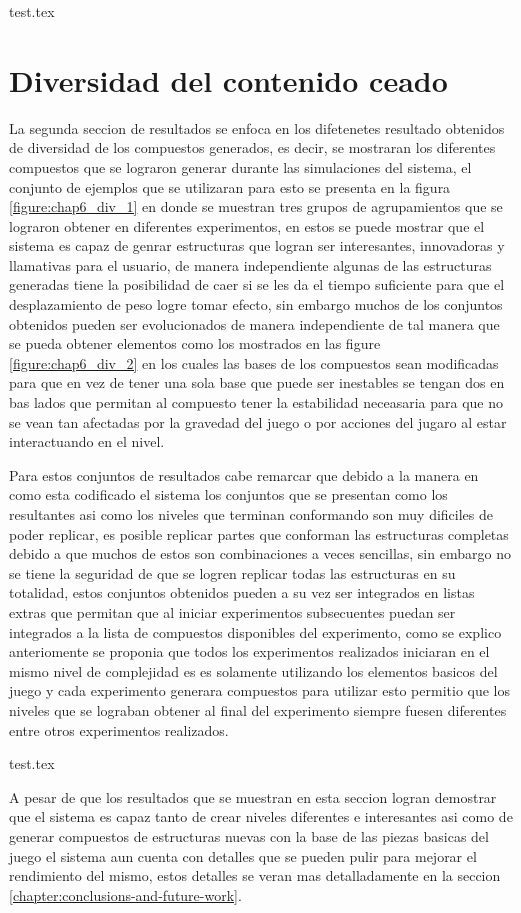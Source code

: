 {test.tex}

\newpage

\section{Diversidad del contenido ceado}
\label{section:chap6_diversity_results}

La segunda seccion de resultados se enfoca en los difetenetes resultado
obtenidos de diversidad de los compuestos generados, es decir, se mostraran los
diferentes compuestos que se lograron generar durante las simulaciones del
sistema, el conjunto de ejemplos que se utilizaran para esto se presenta en la
figura \ref{figure:chap6_div_1} en donde se muestran tres grupos de
agrupamientos que se lograron obtener en diferentes experimentos, en estos se
puede mostrar que el sistema es capaz de genrar estructuras que logran ser
interesantes, innovadoras y llamativas para el usuario, de manera independiente
algunas de las estructuras generadas tiene la posibilidad de caer si se les da
el tiempo suficiente para que el desplazamiento de peso logre tomar efecto, sin
embargo muchos de los conjuntos obtenidos pueden ser evolucionados de manera
independiente de tal manera que se pueda obtener elementos como los mostrados en
las figure \ref{figure:chap6_div_2} en los cuales las bases de los compuestos
sean modificadas para que en vez de tener una sola base que puede ser inestables
se tengan dos en bas lados que permitan al compuesto tener la estabilidad
neceasaria para que no se vean tan afectadas por la gravedad del juego o por
acciones del jugaro al estar interactuando en el nivel.

Para estos conjuntos de resultados cabe remarcar que debido a la manera en como
esta codificado el sistema los conjuntos que se presentan como los resultantes
asi como los niveles que terminan conformando son muy dificiles de poder
replicar, es posible replicar partes que conforman las estructuras completas
debido a que muchos de estos son combinaciones a veces sencillas, sin embargo no
se tiene la seguridad de que se logren replicar todas las estructuras en su
totalidad, estos conjuntos obtenidos pueden a su vez ser integrados en listas
extras que permitan que al iniciar experimentos subsecuentes puedan ser
integrados a la lista de compuestos disponibles del experimento, como se explico
anteriomente se proponia que todos los experimentos realizados iniciaran en el
mismo nivel de complejidad es es solamente utilizando los elementos basicos del
juego y cada experimento generara compuestos para utilizar esto permitio que los
niveles que se lograban obtener al final del experimento siempre fuesen
diferentes entre otros experimentos realizados.

{test.tex}

A pesar de que los resultados que se muestran en esta seccion logran demostrar
que el sistema es capaz tanto de crear niveles diferentes e interesantes asi
como de generar compuestos de estructuras nuevas con la base de las piezas
basicas del juego el sistema aun cuenta con detalles que se pueden pulir para
mejorar el rendimiento del mismo, estos detalles se veran mas detalladamente en
la seccion \ref{chapter:conclusions-and-future-work}.